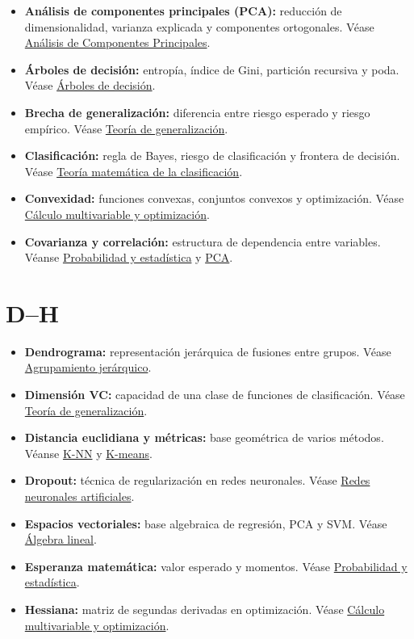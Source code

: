 \documentclass[
  spanish,
  10.5pt,
  letterpaper,
  DIV=11,
  numbers=noendperiod,
  oneside,
  open=any]{scrreprt}
\providecommand{\tightlist}{%
  \setlength{\itemsep}{0pt}\setlength{\parskip}{0pt}}
\theoremstyle{definition}
\theoremstyle{definition}
\theoremstyle{plain}
\theoremstyle{remark}
\begin{document}
\begin{itemize}
\tightlist
\item
  \textbf{Análisis de componentes principales (PCA):} reducción de
  dimensionalidad, varianza explicada y componentes ortogonales. Véase
  \hyperref[sec-pca]{Análisis de Componentes Principales}.
\item
  \textbf{Árboles de decisión:} entropía, índice de Gini, partición
  recursiva y poda. Véase \hyperref[sec-arboles-decision]{Árboles de
  decisión}.
\item
  \textbf{Brecha de generalización:} diferencia entre riesgo esperado y
  riesgo empírico. Véase \hyperref[sec-teoria-generalizacion]{Teoría de
  generalización}.
\item
  \textbf{Clasificación:} regla de Bayes, riesgo de clasificación y
  frontera de decisión. Véase \hyperref[sec-teoria-clasificacion]{Teoría
  matemática de la clasificación}.
\item
  \textbf{Convexidad:} funciones convexas, conjuntos convexos y
  optimización. Véase \hyperref[sec-calculo-optimizacion]{Cálculo
  multivariable y optimización}.
\item
  \textbf{Covarianza y correlación:} estructura de dependencia entre
  variables. Véanse \hyperref[sec-probabilidad-estadistica]{Probabilidad
  y estadística} y \hyperref[sec-pca]{PCA}.
\end{itemize}

\section*{D--H}\label{dh-1}


\begin{itemize}
\tightlist
\item
  \textbf{Dendrograma:} representación jerárquica de fusiones entre
  grupos. Véase \hyperref[sec-agrupamiento-jerarquico]{Agrupamiento
  jerárquico}.
\item
  \textbf{Dimensión VC:} capacidad de una clase de funciones de
  clasificación. Véase \hyperref[sec-teoria-generalizacion]{Teoría de
  generalización}.
\item
  \textbf{Distancia euclidiana y métricas:} base geométrica de varios
  métodos. Véanse \hyperref[sec-knn]{K-NN} y
  \hyperref[sec-kmeans]{K-means}.
\item
  \textbf{Dropout:} técnica de regularización en redes neuronales. Véase
  \hyperref[sec-redes-neuronales]{Redes neuronales artificiales}.
\item
  \textbf{Espacios vectoriales:} base algebraica de regresión, PCA y
  SVM. Véase \hyperref[sec-algebra-lineal]{Álgebra lineal}.
\item
  \textbf{Esperanza matemática:} valor esperado y momentos. Véase
  \hyperref[sec-probabilidad-estadistica]{Probabilidad y estadística}.
\item
  \textbf{Hessiana:} matriz de segundas derivadas en optimización. Véase
  \hyperref[sec-calculo-optimizacion]{Cálculo multivariable y
  optimización}.
\end{itemize}
\end{document}
